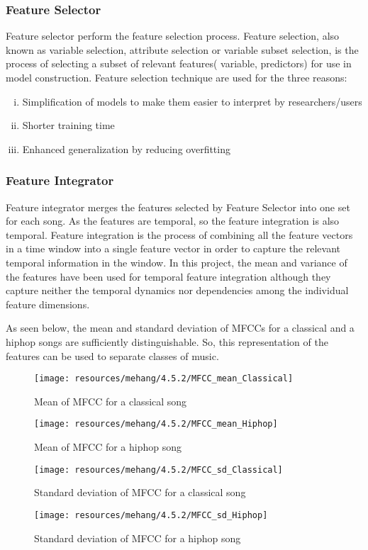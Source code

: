 \subsubsection{Feature Selector}
Feature selector perform the feature selection process. Feature selection, also known as variable 
selection, attribute selection or variable subset selection, is the process of selecting a subset of relevant features( variable, predictors) for use in model construction. Feature selection technique are used for the three reasons:
\begin{enumerate}[(i)]
        \item Simplification of models to make them easier to interpret by researchers/users
        \item Shorter training time
        \item Enhanced generalization by reducing overfitting
\end{enumerate}

\subsubsection{Feature Integrator}
Feature integrator merges the features selected by Feature Selector into one set for each song.
As the features are temporal, so the feature integration is also temporal.
Feature integration is the process of combining all the feature vectors in a time window into a single feature vector in order to capture the relevant temporal information in the window. 
In this project, the mean and variance of the features have been used for temporal feature integration
although they capture neither the temporal dynamics nor dependencies among the individual feature dimensions.

As seen below, the mean and standard deviation of MFCCs for a classical and a hiphop songs are sufficiently distinguishable. 
So, this representation of the features can be used to separate classes of music.
\begin{figure}[h!]
        \centering
        \texttt{[image: resources/mehang/4.5.2/MFCC\_mean\_Classical]}
        \caption{Mean of MFCC for a  classical song}
\end{figure}
\begin{figure}[h!]
        \centering
        \texttt{[image: resources/mehang/4.5.2/MFCC\_mean\_Hiphop]}
        \caption{Mean of MFCC for a hiphop song}
\end{figure}
\begin{figure}[h!]
        \centering
        \texttt{[image: resources/mehang/4.5.2/MFCC\_sd\_Classical]}
        \caption{Standard deviation of MFCC for a classical song}
\end{figure}
\begin{figure}[h!]
        \centering
        \texttt{[image: resources/mehang/4.5.2/MFCC\_sd\_Hiphop]}
        \caption{Standard deviation of MFCC for a hiphop song}
\end{figure}


